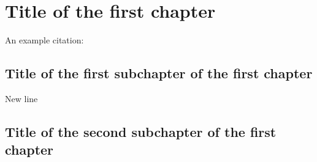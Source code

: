\chapter{Title of the first chapter}

An example citation: \cite{Andel07}

\section{Title of the first subchapter of the first chapter}

New line

\section{Title of the second subchapter of the first chapter}
